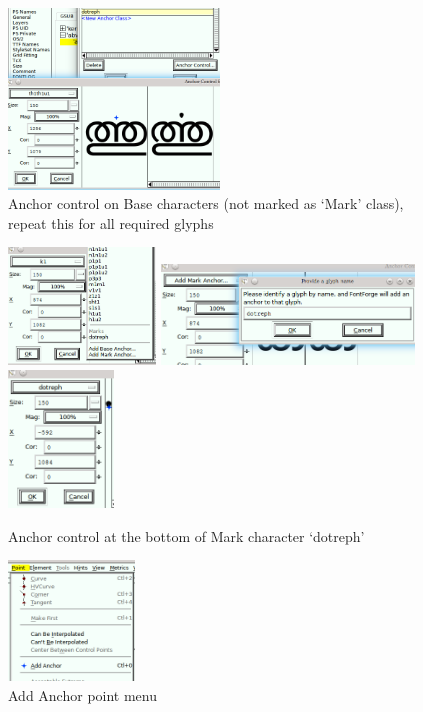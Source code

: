 \begin{figure}[H]
  \includegraphics[width=0.5\textwidth]{images/malayalam-meera-gpos-abvm-3.png}
  \caption{Anchor control on Base characters (not marked as ‘Mark’ class), repeat this for all required glyphs}
\end{figure}
\begin{figure}[H]
  \includegraphics[width=0.35\textwidth]{images/malayalam-meera-add-mark-anchor-1.png}
  \includegraphics[width=0.6\textwidth]{images/malayalam-meera-add-mark-anchor-2.png}
  \includegraphics[width=0.25\textwidth]{images/malayalam-meera-add-mark-anchor-3.png}
  \caption{Anchor control at the bottom of Mark character ‘dotreph’}
\end{figure}
\begin{figure}[H]
  \includegraphics[width=0.3\textwidth]{images/malayalam-meera-conjunct-add-anchor.png}
  \caption{Add Anchor point menu}
\end{figure}
